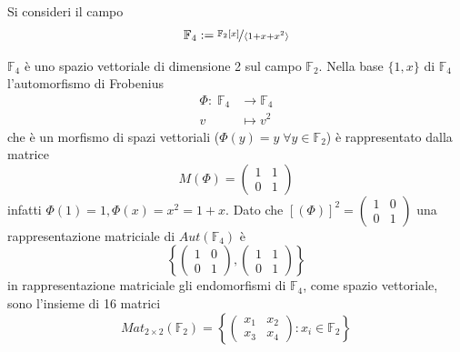 \documentclass[../main.tex]{subfiles}
\begin{document}
\begin{example}
    Si consideri il campo
    \begin{eqnarray*}
        \mathbb{F}_4 := \nicefrac{\mathbb{F}_2[x]}{\langle 1 + x + x^2 \rangle}
    \end{eqnarray*}

    $\mathbb{F}_4$ è uno spazio vettoriale di dimensione 2 sul campo $\mathbb{F}_2$. Nella base $\{1, x\}$ di $\mathbb{F}_4$ l'automorfismo di Frobenius
    \begin{align*}
        \Phi : \; \mathbb{F}_4 & \rightarrow \mathbb{F}_4 \\
        v                      & \mapsto v^2
    \end{align*}
    che è un morfismo di spazi vettoriali ($\Phi(y) = y \; \forall y \in \mathbb{F}_2$) è rappresentato dalla matrice
    \begin{equation*}
        M(\Phi) = \begin{pmatrix}
            1 & 1 \\
            0 & 1
        \end{pmatrix}
    \end{equation*}
    infatti $\Phi(1) = 1, \Phi(x) = x^2 = 1 + x$. Dato che $[(\Phi)]^2 = \begin{pmatrix}
            1 & 0 \\
            0 & 1
        \end{pmatrix}$ una rappresentazione matriciale di $Aut(\mathbb{F}_4)$ è\\
    \begin{equation*}
        \left\{\begin{pmatrix}
            1 & 0 \\
            0 & 1
        \end{pmatrix},
        \begin{pmatrix}
            1 & 1 \\
            0 & 1
        \end{pmatrix}\right\}
    \end{equation*}
    in rappresentazione matriciale gli endomorfismi di $\mathbb{F}_4$, come spazio vettoriale, sono l'insieme di 16 matrici
    \begin{equation*}
        Mat_{2 \times 2}(\mathbb{F}_2) = \left\{
        \begin{pmatrix}
            x_1 & x_2 \\
            x_3 & x_4
        \end{pmatrix} :
        x_i \in \mathbb{F}_2\right\}
    \end{equation*}
\end{example}
\end{document}
